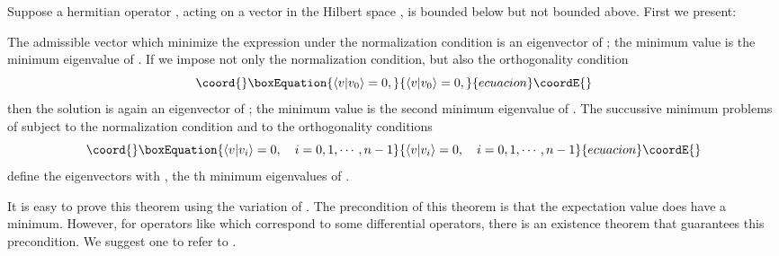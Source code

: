 \documentclass[a4paper,a4paper]{article}
\begin{document}
Suppose a hermitian operator \coordHE{}, acting on a vector \coordHE{}
in the Hilbert space \coordHE{}, is bounded below but not
bounded above. First we present:
\begin{theorem}\label{min}
The admissible vector \coordHE{} which minimize the expression
\coordHE{} under the normalization condition \coordHE{} is an eigenvector \coordHE{} of \coordHE{}; the minimum
value \coordHE{} is the minimum
eigenvalue of \coordHE{}. If we impose not only the normalization
condition, but also the orthogonality condition
\begin{equation}\coord{}\boxEquation{
\langle v|v_0\rangle=0,
}{
\langle v|v_0\rangle=0,
}{ecuacion}\coordE{}\end{equation}
then the solution is again an eigenvector \coordHE{} of \coordHE{};
the minimum value \coordHE{} is the second minimum eigenvalue of
\coordHE{}. The succussive minimum problems of \coordHE{}
subject to the normalization condition and to the orthogonality
conditions
\begin{equation}\coord{}\boxEquation{
\langle v|v_i\rangle=0,\quad i=0,1,\cdots,n-1
}{
\langle v|v_i\rangle=0,\quad i=0,1,\cdots,n-1
}{ecuacion}\coordE{}\end{equation}
define the eigenvectors \coordHE{} with \coordHE{}, the \coordHE{}th
minimum eigenvalues of \coordHE{}.
\end{theorem}
It is easy to prove this theorem using the variation of \coordHE{}. The precondition of this theorem
is that the expectation value \coordHE{} does have a
minimum. However, for operators like \coordHE{}
which correspond to some differential operators, there is an
existence theorem that guarantees this precondition. We suggest
one to refer to \cite{Hilbert}.
\end{document}
